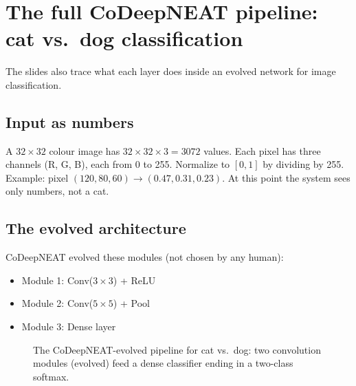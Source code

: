 \documentclass[a4paper,11pt]{article}
\begin{document}
\section{The full CoDeepNEAT pipeline: cat vs.\ dog classification}

The slides also trace what each layer does inside an evolved network
for image classification.

\subsection{Input as numbers}

A $32\times32$ colour image has $32 \times 32 \times 3 = 3072$ values.
Each pixel has three channels (R, G, B), each from 0 to 255.
Normalize to $[0, 1]$ by dividing by 255.
Example: pixel $(120, 80, 60) \to (0.47, 0.31, 0.23)$.
At this point the system sees only numbers, not a cat.

\subsection{The evolved architecture}

CoDeepNEAT evolved these modules (not chosen by any human):
\begin{itemize}
  \item Module 1: Conv($3\times3$) + ReLU
  \item Module 2: Conv($5\times5$) + Pool
  \item Module 3: Dense layer
\end{itemize}

\begin{figure}[htbp]
\centering
{}
\caption*{\small\color{mutedtext}The CoDeepNEAT-evolved pipeline for cat vs.\ dog: two convolution modules (evolved) feed a dense classifier ending in a two-class softmax.}
\end{figure}
\end{document}
